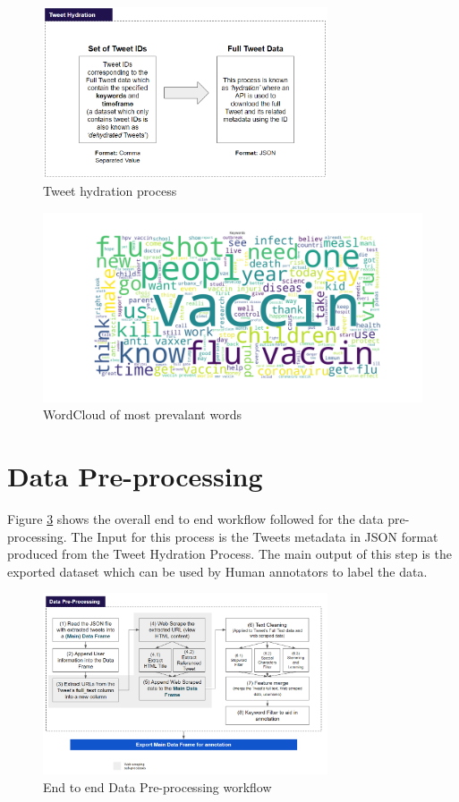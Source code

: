 \documentclass[12pt]{article}
\begin{document}
\begin{figure}[tbp]
\centering 
\includegraphics[width=0.75\textwidth]{figures/tweet_hydration}
\caption{Tweet hydration process} 
\label{fig:tweet_hydration}
\end{figure}

\begin{figure}[tbp]
\centering 
\includegraphics[width=1\textwidth]{figures/fig_word_cloud}
\caption{WordCloud of most prevalant words} 
\label{fig:fig_word_cloud}
\end{figure}


\newpage


\section{Data Pre-processing}
Figure \ref{fig:data_prepro} shows the overall end to end workflow followed for the data pre-processing. The Input for this process is the Tweets metadata in JSON format produced from the Tweet Hydration Process. The main output of this step is the exported dataset which can be used by Human annotators to label the data. 

\begin{figure}[tbp]
\centering 
\includegraphics[width=0.75\textwidth]{figures/data_prepro}
\caption{End to end Data Pre-processing workflow} 
\label{fig:data_prepro}
\end{figure}
\end{document}
